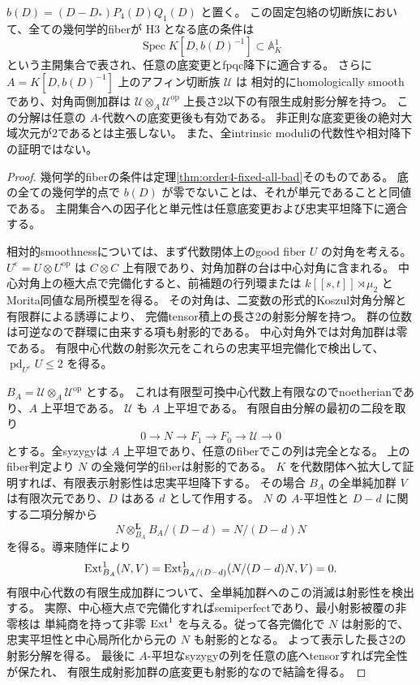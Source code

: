 \begin{corollary}[このD直線上の相対的開性と任意底変更]
\label{cor:order4-relative-open}
$b(D)=(D-D_*)P_4(D)Q_1(D)$ と置く。
この固定包絡の切断族において、全ての幾何学的fiberが H3 となる底の条件は
\[
 \operatorname{Spec}K[D,b(D)^{-1}]\subset\mathbb A^1_K
\]
という主開集合で表され、任意の底変更とfpqc降下に適合する。
さらに $A=K[D,b(D)^{-1}]$ 上のアフィン切断族 $\mathcal U$ は
相対的にhomologically smoothであり、対角両側加群は
$\mathcal U\otimes_A\mathcal U^{\mathrm{op}}$ 上長さ2以下の有限生成射影分解を持つ。
この分解は任意の $A$-代数への底変更後も有効である。
非正則な底変更後の絶対大域次元が2であるとは主張しない。
また、全intrinsic moduliの代数性や相対降下の証明ではない。
\end{corollary}
\begin{proof}
幾何学的fiberの条件は定理\ref{thm:order4-fixed-all-bad}そのものである。
底の全ての幾何学的点で $b(D)$ が零でないことは、それが単元であることと同値である。
主開集合への因子化と単元性は任意底変更および忠実平坦降下に適合する。

相対的smoothnessについては、まず代数閉体上のgood fiber $U$ の対角を考える。
$U^e=U\otimes U^{\mathrm{op}}$ は $C\otimes C$ 上有限であり、対角加群の台は中心対角に含まれる。
中心対角上の極大点で完備化すると、前補題の行列環または
$k[[s,t]]\rtimes\mu_2$ とMorita同値な局所模型を得る。
その対角は、二変数の形式的Koszul対角分解と有限群による誘導により、
完備tensor積上の長さ2の射影分解を持つ。
群の位数は可逆なので群環に由来する項も射影的である。
中心対角外では対角加群は零である。
有限中心代数の射影次元をこれらの忠実平坦完備化で検出して、$\operatorname{pd}_{U^e}U\le2$ を得る。

$B_A=\mathcal U\otimes_A\mathcal U^{\mathrm{op}}$ とする。
これは有限型可換中心代数上有限なのでnoetherianであり、$A$ 上平坦である。
$\mathcal U$ も $A$ 上平坦である。
有限自由分解の最初の二段を取り
\[
 0\longrightarrow N\longrightarrow F_1\longrightarrow F_0\longrightarrow\mathcal U\longrightarrow0
\]
とする。全syzygyは $A$ 上平坦であり、任意のfiberでこの列は完全となる。
上のfiber判定より $N$ の全幾何学的fiberは射影的である。
$K$ を代数閉体へ拡大して証明すれば、有限表示射影性は忠実平坦降下する。
その場合 $B_A$ の全単純加群 $V$ は有限次元であり、$D$ はある $d$ として作用する。
$N$ の $A$-平坦性と $D-d$ に関する二項分解から
\[
 N\otimes_{B_A}^{\mathbf L}B_A/(D-d)=N/(D-d)N
\]
を得る。導来随伴により
\[
 \operatorname{Ext}^1_{B_A}(N,V)=\operatorname{Ext}^1_{B_A/(D-d)}(N/(D-d)N,V)=0.
\]
有限中心代数の有限生成加群について、全単純加群へのこの消滅は射影性を検出する。
実際、中心極大点で完備化すればsemiperfectであり、最小射影被覆の非零核は
単純商を持って非零 $\operatorname{Ext}^1$ を与える。従って各完備化で $N$ は射影的で、
忠実平坦性と中心局所化から元の $N$ も射影的となる。
よって表示した長さ2の射影分解を得る。
最後に $A$-平坦なsyzygyの列を任意の底へtensorすれば完全性が保たれ、
有限生成射影加群の底変更も射影的なので結論を得る。
\end{proof}
